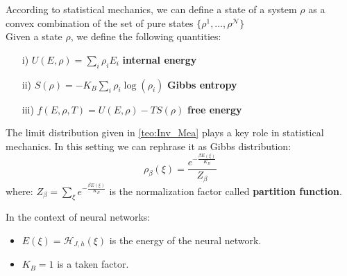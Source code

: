 \begin{definition}
	\label{def:gibbs_stat}
	According to statistical mechanics, we can define a state of a system $\rho$ as a convex combination of the set of pure states $\{\rho^1,\ldots,\rho^{\mathcal{N}} \}$\\
	Given a state $\rho$, we define the following quantities:
	\begin{itemize}
		\item[i)] $U(E,\rho) = \sum_i \rho_i E_i$ \quad\textbf{internal energy}
		\item[ii)] $S(\rho) = -K_B \sum_i \rho_i \log(\rho_i) $ \quad \textbf{Gibbs entropy}
		\item[iii)] $ f(E,\rho,T) = U(E,\rho) - T S(\rho) $ \quad \textbf{free energy}
	\end{itemize}
\end{definition}
\begin{definition}
    \label{def:GibbsDist}
    The limit distribution given in \cref{teo:Inv_Mea} plays a key role in statistical mechanics. In this setting we can rephrase it as Gibbs distribution: \\
    \[
    \rho_{\beta}(\xi) = \frac{e^{-\frac{\beta E(\xi)}{K_B}}}{Z_{\beta}}
    \]
    where: $Z_\beta = \sum_\xi e^{-\frac{\beta E(\xi)}{K_B}} $ is the normalization factor called \textbf{partition function}.

    \bigskip\noindent In the context of neural networks:
    \begin{itemize}
       \item $E(\xi)=\mathcal{H}_{J,h}(\xi)$ is the energy of the neural network.
       \item $K_B=1$ is a taken factor.
    \end{itemize}
\end{definition}

